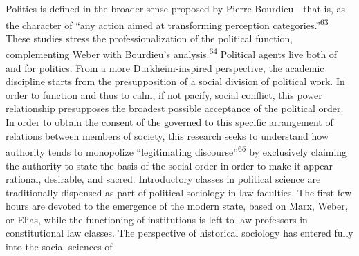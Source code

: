 \documentclass{tufte-handout}
\begin{document}
Politics is defined in the broader sense proposed by Pierre
Bourdieu---that is, as the character of ``any action aimed at
transforming perception categories.''\textsuperscript{63}
These studies stress the professionalization of the political function,
complementing Weber with Bourdieu's analysis.\textsuperscript{64} Political agents live both of and for politics. From a
more Durkheim-inspired perspective, the academic discipline starts from
the presupposition of a social division of political work. In order to
function and thus to calm, if not pacify, social conflict, this power
relationship presupposes the broadest possible acceptance of the
political order. In order to obtain the consent of the governed to this
specific arrangement of relations between members of society, this
research seeks to understand how authority tends to monopolize
``legitimating discourse''\textsuperscript{65} by exclusively claiming the authority to state the
basis of the social order in order to make it appear rational,
desirable, and sacred. Introductory classes in political science are
traditionally dispensed as part of political sociology in law faculties.
The first few hours are devoted to the emergence of the modern state,
based on Marx, Weber, or Elias, while the functioning of institutions is
left to law professors in constitutional law classes. The perspective of
historical sociology has entered fully into the social sciences of
\end{document}
